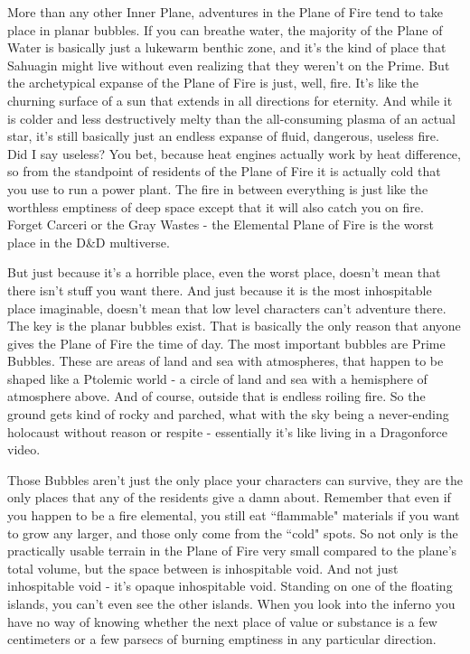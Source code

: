 More than any other Inner Plane, adventures in the Plane of Fire tend to take place in planar bubbles. If you can breathe water, the majority of the Plane of Water is basically just a lukewarm benthic zone, and it's the kind of place that Sahuagin might live without even realizing that they weren't on the Prime. But the archetypical expanse of the Plane of Fire is just, well, fire. It's like the churning surface of a sun that extends in all directions for eternity. And while it is colder and less destructively melty than the all-consuming plasma of an actual star, it's still basically just an endless expanse of fluid, dangerous, useless fire. Did I say useless? You bet, because heat engines actually work by heat difference, so from the standpoint of residents of the Plane of Fire it is actually cold that you use to run a power plant. The fire in between everything is just like the worthless emptiness of deep space except that it will also catch you on fire. Forget Carceri or the Gray Wastes - the Elemental Plane of Fire is the worst place in the D\&D multiverse.

But just because it's a horrible place, even the worst place, doesn't mean that there isn't stuff you want there. And just because it is the most inhospitable place imaginable, doesn't mean that low level characters can't adventure there. The key is the planar bubbles exist. That is basically the only reason that anyone gives the Plane of Fire the time of day. The most important bubbles are Prime Bubbles. These are areas of land and sea with atmospheres, that happen to be shaped like a Ptolemic world - a circle of land and sea with a hemisphere of atmosphere above. And of course, outside that is endless roiling fire. So the ground gets kind of rocky and parched, what with the sky being a never-ending holocaust without reason or respite - essentially it's like living in a Dragonforce video.

Those Bubbles aren't just the only place your characters can survive, they are the only places that any of the residents give a damn about. Remember that even if you happen to be a fire elemental, you still eat ``flammable" materials if you want to grow any larger, and those only come from the ``cold" spots. So not only is the practically usable terrain in the Plane of Fire very small compared to the plane's total volume, but the space between is inhospitable void. And not just inhospitable void - it's opaque inhospitable void. Standing on one of the floating islands, you can't even see the other islands. When you look into the inferno you have no way of knowing whether the next place of value or substance is a few centimeters or a few parsecs of burning emptiness in any particular direction.

